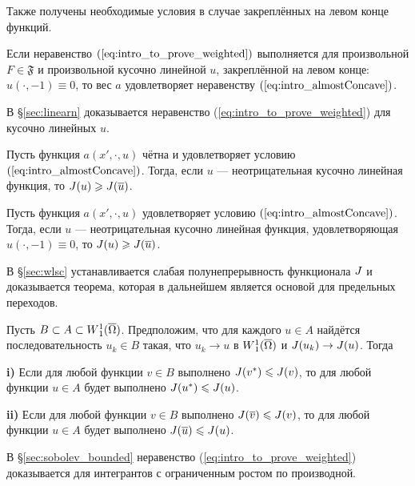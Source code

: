 Также получены необходимые условия в случае закреплённых на левом конце функций.

\begin{thmIntro}
Если неравенство $(\ref{eq:intro_to_prove_weighted})$ выполняется для произвольной $F \in \mathfrak{F}$
и произвольной кусочно линейной $u$, закреплённой на левом конце: $u(\cdot, -1) \equiv 0$,
то вес $a$ удовлетворяет неравенству $(\ref{eq:intro_almostConcave})$.
\end{thmIntro}

В \S\ref{sec:linearn} доказывается неравенство (\ref{eq:intro_to_prove_weighted}) для кусочно линейных $u$.

\begin{lmIntro}
Пусть функция $a(x', \cdot, u)$ чётна и удовлетворяет условию $(\ref{eq:intro_almostConcave})$.
Тогда, если $u$ --- неотрицательная кусочно линейная функция, то $\IWg( u ) \ge \IWg( \mon{u} )$.
\end{lmIntro}

\begin{lmIntro}
Пусть функция $a(x', \cdot, u)$ удовлетворяет условию $(\ref{eq:intro_almostConcave})$.
Тогда, если $u$ --- неотрицательная кусочно линейная функция, удовлетворяющая $u(\cdot, -1) \equiv 0$,
то $\IWg( u ) \ge \IWg( \mon{u} )$.
\end{lmIntro}

В \S\ref{sec:wlsc} устанавливается слабая полунепрерывность функционала $J$
и доказывается теорема, которая в дальнейшем является основой для предельных переходов.

\begin{thmIntro}
Пусть $B \subset A \subset \W(\overline{\Omega})$.
Предположим, что для каждого $u \in A$ найдётся последовательность $u_k \in B$ такая,
что $u_k \to u$ в $\W(\overline{\Omega})$ и $J( u_k ) \to J( u )$.
Тогда

\textbf{\textup{i)}}
Если для любой функции $v \in B$ выполнено $J( {v^*} ) \leqslant J( v )$,
то для любой функции $u \in A$ будет выполнено $J( {u^*} ) \leqslant J( u )$.

\textbf{\textup{ii)}}
Если для любой функции $v \in B$ выполнено $\IWg( \mon{v} ) \le \IWg( v )$,
то для любой функции $u \in A$ будет выполнено $\IWg( \mon{u} ) \le \IWg( u )$.
\end{thmIntro}

В \S\ref{sec:sobolev_bounded} неравенство (\ref{eq:intro_to_prove_weighted}) доказывается для интегрантов с ограниченным ростом по производной.

